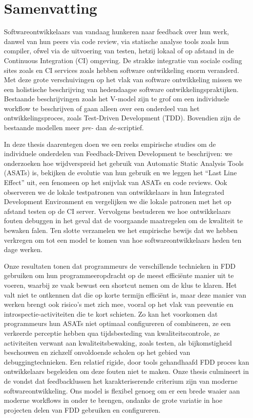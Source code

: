 \chapter*{Samenvatting}

{

Softwareontwikkelaars van vandaag hunkeren naar feedback over hun werk, danwel van hun peers via
code review, via statische analyse tools zoals hun compiler, ofwel via de uitvoering van testen, hetzij
lokaal of op afstand in de Continuous Integration (CI) omgeving. De strakke integratie van sociale
coding sites zoals \github en CI services zoals \travis hebben software ontwikkeling enorm
veranderd. Met deze grote verschuivingen op het vlak van software ontwikkeling missen we een
holistische beschrijving van hedendaagse software ontwikkelingspraktijken. Bestaande beschrijvingen
zoals het V-model zijn te grof om een individuele workflow te beschrijven of gaan alleen over een
onderdeel van het ontwikkelingsproces, zoals Test-Driven Development (TDD). Bovendien zijn de
bestaande modellen meer \emph{pre-} dan \emph{de-}scriptief.

In deze thesis daarentegen doen we een reeks empirische studies om de individuele onderdelen van
Feedback-Driven Development te beschrijven: we onderzoeken hoe wijdverspreid het gebruik van
Automatic Static Analysis Tools (ASATs) is, bekijken de evolutie van hun
gebruik en we leggen
het ``Last Line Effect'' uit, een fenomeen op het snijvlak van ASATs en code
reviews. Ook observeren we
de lokale testpatronen van ontwikkelaars in hun Integrated Development
Environment en vergelijken we
die lokale patronen met het op afstand testen op de CI server. Vervolgens bestuderen we hoe
ontwikkelaars fouten debuggen in het geval dat de voorgaande maatregelen om de kwaliteit te bewaken
falen. Ten slotte verzamelen we het empirische bewijs dat we hebben verkregen om
tot een model te komen van hoe softwareontwikkelaars heden ten dage werken.


Onze resultaten tonen dat programmeurs de verschillende technieken in FDD gebruiken om hun
programmeeropdracht op de meest effici{\"e}nte manier uit te voeren, waarbij ze vaak bewust een
shortcut nemen om de klus te klaren. Het valt niet te ontkennen dat die op korte termijn effici{\"e}nt
is, maar deze manier van werken brengt ook risico’s met zich mee, vooral op het vlak van preventie
en introspectie-activiteiten die te kort schieten. Zo kan het voorkomen dat programmeurs hun ASATs
niet optimaal configureren of combineren, ze een verkeerde perceptie hebben qua tijdsbesteding van
kwaliteitscontrole, ze activiteiten verwant aan kwaliteitsbewaking, zoals testen, als
bijkomstigheid beschouwen en zichzelf onvoldoende scholen op het gebied van debuggingtechnieken. Een relatief rigide, door tools gehandhaafd FDD proces kan ontwikkelaars begeleiden om
deze fouten niet te maken. Onze thesis culmineert in de vondst dat feedbacklussen het
karakteriserende criterium zijn van moderne softwareontwikkeling. Ons model is flexibel genoeg om
er een brede waaier aan moderne workflows in onder te brengen, ondanks de grote variatie in hoe
projecten delen van FDD gebruiken en configureren.}



